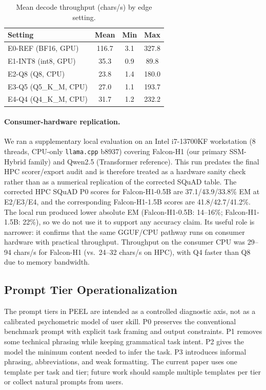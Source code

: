 \documentclass[letterpaper]{article} %
\begin{document}
\begin{table}[t]
  \small\centering
  \caption{Mean decode throughput (chars/s) by edge setting.}
  \label{tab:latency}
  \begin{tabular}{@{}lccc@{}}
    \toprule
    Setting & Mean & Min & Max \\
    \midrule
    E0-REF (BF16, GPU) & 116.7 & 3.1 & 327.8 \\
    E1-INT8 (int8, GPU) & 35.3 & 0.9 & 89.8 \\
    E2-Q8 (Q8, CPU) & 23.8 & 1.4 & 180.0 \\
    E3-Q5 (Q5\_K\_M, CPU) & 27.0 & 1.1 & 193.7 \\
    E4-Q4 (Q4\_K\_M, CPU) & 31.7 & 1.2 & 232.2 \\
    \bottomrule
  \end{tabular}
\end{table}

\paragraph{Consumer-hardware replication.}
We ran a supplementary local evaluation on an Intel i7-13700KF workstation
(8 threads, CPU-only \texttt{llama.cpp} b8937) covering Falcon-H1 (our primary
SSM-Hybrid family) and Qwen2.5 (Transformer reference). This run predates the
final HPC scorer/export audit and is therefore treated as a hardware sanity
check rather than as a numerical replication of the corrected SQuAD table.
The corrected HPC SQuAD P0 scores for Falcon-H1-0.5B are 37.1/43.9/33.8\% EM
at E2/E3/E4, and the corresponding Falcon-H1-1.5B scores are
41.8/42.7/41.2\%. The local run produced lower absolute EM
(Falcon-H1-0.5B: 14--16\%; Falcon-H1-1.5B: 22\%), so we do not use it to
support any accuracy claim. Its useful role is narrower: it confirms that the
same GGUF/CPU pathway runs on consumer hardware with practical throughput.
Throughput on the consumer CPU was 29--94 chars/s for Falcon-H1 (vs.\
24--32 chars/s on HPC), with Q4 faster than Q8 due to memory bandwidth.

\subsection{Prompt Tier Operationalization}

The prompt tiers in PEEL are intended as a controlled diagnostic axis, not
as a calibrated psychometric model of user skill. P0 preserves the conventional
benchmark prompt with explicit task framing and output constraints. P1 removes
some technical phrasing while keeping grammatical task intent. P2 gives the
model the minimum content needed to infer the task. P3 introduces informal
phrasing, abbreviations, and weak formatting. The current paper uses one
template per task and tier; future work should sample multiple templates per
tier or collect natural prompts from users.
\end{document}
